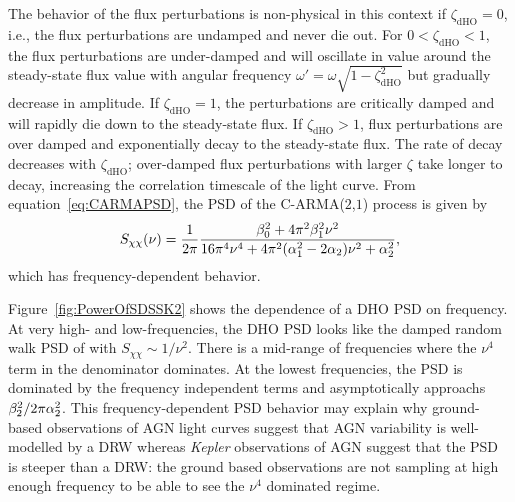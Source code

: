 \documentclass[a4paper,fleqn,usenatbib]{mnras}
\begin{document}
The behavior of the flux perturbations is non-physical in this context if $\zeta_{\mathrm{dHO}} = 0$, i.e., the flux perturbations are undamped and never die out. For $0 < \zeta_{\mathrm{dHO}} < 1$, the flux perturbations are under-damped and will oscillate in value around the steady-state flux value with angular frequency $\omega' = \omega\sqrt{1 - \zeta_{\mathrm{dHO}}^{2}}$ but gradually decrease in amplitude. If $\zeta_{\mathrm{dHO}} = 1$, the perturbations are critically damped and will rapidly die down to the steady-state flux. If $\zeta_{\mathrm{dHO}} > 1$, flux perturbations are over damped and exponentially decay to the steady-state flux. The rate of decay decreases with $\zeta_{\mathrm{dHO}}$; over-damped flux perturbations with larger $\zeta$ take longer to decay, increasing the correlation timescale of the light curve. From equation~\eqref{eq:CARMAPSD}, the PSD of the C-ARMA($2$,$1$) process is given by
\begin{equation}\label{eq:CARMA21PSD}
S_{\chi\chi}(\nu) = \frac{1}{2\pi}\frac{\beta_{0}^{2} + 4\pi^{2}\beta_{1}^{2}\nu^{2}}{16\pi^{4}\nu^{4} + 4\pi^{2}(\alpha_{1}^{2}-2\alpha_{2})\nu^{2} + \alpha_{2}^{2}},
\end{equation}
which has frequency-dependent behavior.

Figure~\ref{fig:PowerOfSDSSK2} shows the dependence of a DHO PSD on frequency. At very high- and low-frequencies, the DHO PSD looks like the damped random walk PSD of \citet{Kelly09} with $S_{\chi\chi} \sim 1/\nu^{2}$. There is a mid-range of frequencies where the $\nu^{4}$ term in the denominator dominates. At the lowest frequencies, the PSD is dominated by the frequency independent terms and asymptotically approachs $\beta_{2}^{2}/2\pi \alpha_{2}^{2}$. This frequency-dependent PSD behavior may explain why ground-based observations of AGN light curves suggest that AGN variability is well-modelled by a DRW whereas \textit{Kepler} observations of AGN suggest that the PSD is steeper than a DRW: the ground based observations are not sampling at high enough frequency to be able to see the $\nu^{4}$ dominated regime.
\end{document}
